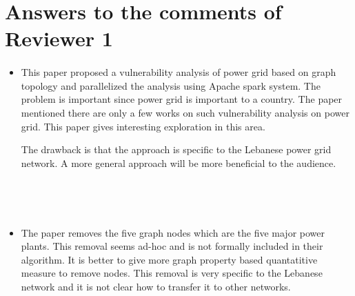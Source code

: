\section{Answers to the comments of Reviewer 1}

\paragraph{}
\begin{itemize}
\item This paper proposed a vulnerability analysis of power grid based on graph topology and parallelized the analysis using Apache spark system. The problem is important since power grid is important to a country. The paper mentioned there are only a few works on such vulnerability analysis on power grid. This paper gives interesting exploration in this area. 

The drawback is that the approach is specific to the Lebanese power grid network. A more general approach will be more beneficial to the audience.

~


~

\item The paper removes the five graph nodes which are the five major power plants. This removal seems  ad-hoc and is not formally included in their algorithm. It is better to give more graph property based quantatitive measure to remove nodes. This removal is very specific to the Lebanese network and it is not clear how to transfer it to other networks.

~



\end{itemize}
